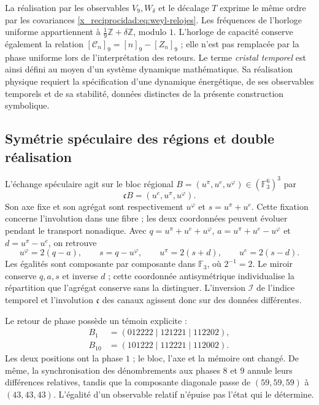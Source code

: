 La réalisation par les observables \(V_9,W_\delta\) et le décalage
\(T\) exprime le même ordre par les covariances
\eqref{x_reciprocidad:eq:weyl-relojes}. Les fréquences de l'horloge uniforme appartiennent à
\(\frac19\mathbb Z+\delta\mathbb Z\), modulo \(1\). L'horloge de
capacité conserve également la relation
\([\mathcal C_n]_9=[n]_9-[Z_n]_9\) ; elle n'est pas remplacée par la phase uniforme
lors de l'interprétation des retours. Le terme \emph{cristal temporel} est ainsi
défini au moyen d'un système dynamique mathématique. Sa réalisation physique
requiert la spécification d'une dynamique énergétique, de ses observables temporels
et de sa stabilité, données distinctes de la présente construction symbolique.

\subsection{Symétrie spéculaire des régions et double réalisation}
\label{x_reciprocidad:mono-ampl:regiones}

L'échange spéculaire agit sur le bloc régional
\(B=(u^\pi,u^e,u^\varphi)\in(\mathbb F_3^6)^3\) par
\[
 \mathfrak cB=(u^e,u^\pi,u^\varphi).
\]
Son axe fixe et son agrégat sont respectivement \(u^\varphi\) et
\(s=u^\pi+u^e\). Cette fixation concerne l'involution dans une fibre ;
les deux coordonnées peuvent évoluer pendant le transport nonadique.
Avec \(q=u^\pi+u^e+u^\varphi\),
\(a=u^\pi+u^e-u^\varphi\) et \(d=u^\pi-u^e\), on retrouve
\[
 u^\varphi=2(q-a),\qquad s=q-u^\varphi,\qquad
 u^\pi=2(s+d),\qquad u^e=2(s-d).
\]
Les égalités sont composante par composante dans \(\mathbb F_3\), où
\(2^{-1}=2\). Le miroir conserve \(q,a,s\) et inverse \(d\) ; cette
coordonnée antisymétrique individualise la répartition que l'agrégat conserve
sans la distinguer. L'inversion \(\mathcal I\) de l'indice temporel et
l'involution \(\mathfrak c\) des canaux agissent donc sur des
données différentes.

Le retour de phase possède un témoin explicite :
\[
 \begin{aligned}
 B_1&=(012222\mid121221\mid112202),\\
 B_{10}&=(101222\mid112221\mid112002).
 \end{aligned}
\]
Les deux positions ont la phase \(1\) ; le bloc, l'axe et la mémoire ont
changé. De même, la synchronisation des dénombrements aux phases \(8\) et
\(9\) annule leurs différences relatives, tandis que la composante diagonale
passe de \((59,59,59)\) à \((43,43,43)\). L'égalité d'un observable
relatif n'épuise pas l'état qui le détermine.

